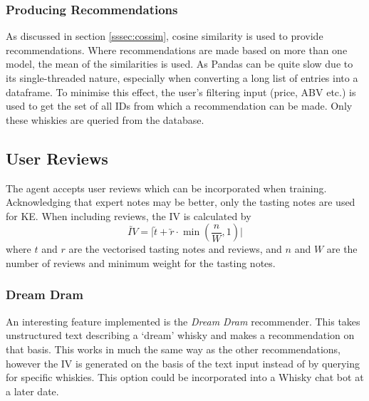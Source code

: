 \subsubsection{Producing Recommendations}
As discussed in section \ref{sssec:cossim}, cosine similarity is used to provide recommendations.
Where recommendations are made based on more than one model, the mean of the similarities is used.
As Pandas can be quite slow due to its single-threaded nature, especially
when converting a long list of entries into a dataframe. To minimise this effect, the user's filtering input 
(price, ABV etc.) is used to get the set of all IDs from which a recommendation can be made.
Only these whiskies are queried from the database.

\subsection{User Reviews}
The agent accepts user reviews which can be incorporated when training. Acknowledging that expert notes may be better,
only the tasting notes are used for KE. When including reviews, the IV is calculated by
\begin{equation}\label{eqn:revweight}
    \utilde{IV} = \vert \utilde{t} + \utilde{r} \cdot \min(\frac{n}{W}, 1) \vert 
\end{equation}
where $t$ and $r$ are the vectorised tasting notes and reviews, and $n$ and $W$ are the number of reviews and minimum weight 
for the tasting notes.

\subsubsection{Dream Dram}
An interesting feature implemented is the \emph{Dream Dram} recommender.  This takes unstructured text describing
a `dream' whisky and makes a recommendation on that basis. This works in much the same way as the other recommendations, 
however the IV is generated on the basis of the text input instead of by querying for specific whiskies. This option 
could be incorporated into a Whisky chat bot at a later date.
